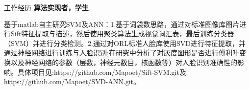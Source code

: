 \begin{rubric}{工作经历}
\entry*[2014-03 至 2014-06]\space\textbf{算法实现者，学生}

基于matlab自主研究SVM及ANN：1.基于词袋数思路，通过对标准图像库图片进行Sift特征提取与描述，然后使用聚类算法生成视觉词汇表，最后训练分类器（SVM）并进行分类检测。2.通过对ORL标准人脸库使用SVD进行特征提取，并通过神经网络进行训练与人脸识别;在研究中分析了对灰度图形是否进行傅利叶变换以及神经网络的参数（层数，神经元数目，核函数等）对人脸识别准确性的影响。具体项目见:https://github.com/Mapoet/Sift-SVM.git及https://github.com/Mapoet/SVD-ANN.git。

\end{rubric}


